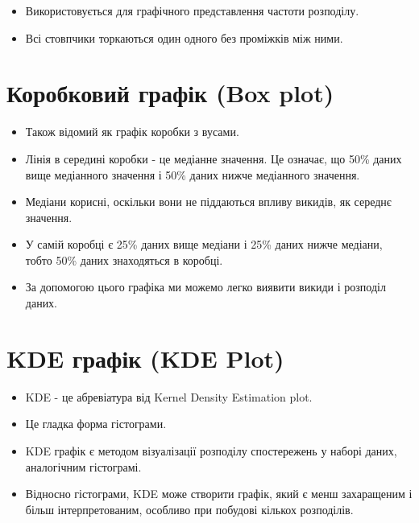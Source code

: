 \documentclass[
  letterpaper,
  DIV=11,
  numbers=noendperiod]{scrreprt}
\providecommand{\tightlist}{%
  \setlength{\itemsep}{0pt}\setlength{\parskip}{0pt}}\usepackage{longtable,booktabs,array}
\begin{document}
\begin{itemize}
\tightlist
\item
  Використовується для графічного представлення частоти розподілу.
\item
  Всі стовпчики торкаються один одного без проміжків між ними.
\end{itemize}

\section{Коробковий графік (Box
plot)}\label{ux43aux43eux440ux43eux431ux43aux43eux432ux438ux439-ux433ux440ux430ux444ux456ux43a-box-plot}

\begin{itemize}
\tightlist
\item
  Також відомий як графік коробки з вусами.
\item
  Лінія в середині коробки - це медіанне значення. Це означає, що 50\%
  даних вище медіанного значення і 50\% даних нижче медіанного значення.
\item
  Медіани корисні, оскільки вони не піддаються впливу викидів, як
  середнє значення.
\item
  У самій коробці є 25\% даних вище медіани і 25\% даних нижче медіани,
  тобто 50\% даних знаходяться в коробці.
\item
  За допомогою цього графіка ми можемо легко виявити викиди і розподіл
  даних.
\end{itemize}

\section{KDE графік (KDE
Plot)}\label{kde-ux433ux440ux430ux444ux456ux43a-kde-plot}

\begin{itemize}
\tightlist
\item
  KDE - це абревіатура від Kernel Density Estimation plot.
\item
  Це гладка форма гістограми.
\item
  KDE графік є методом візуалізації розподілу спостережень у наборі
  даних, аналогічним гістограмі.
\item
  Відносно гістограми, KDE може створити графік, який є менш захаращеним
  і більш інтерпретованим, особливо при побудові кількох розподілів.
\end{itemize}
\end{document}
